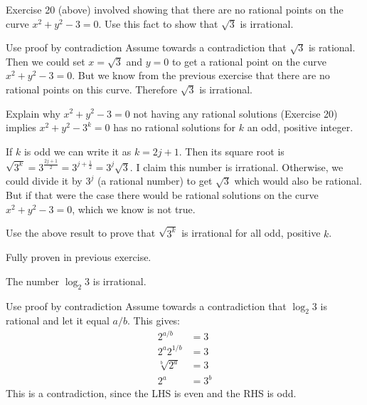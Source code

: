 \documentclass{article}
\begin{document}
\begin{problem}
    Exercise 20 (above) involved showing that there are no rational points on the curve $x^2 + y^2 - 3 = 0$. Use this fact to show that $\sqrt{3}$ is irrational.
\end{problem}
\begin{solution}{Use proof by contradiction}
    Assume towards a contradiction that $\sqrt{3}$ is rational. Then we could set $x = \sqrt{3}$ and $y = 0$ to get a rational point on the curve $x^2 + y^2 - 3 = 0$. But we know from the previous exercise that there are no rational points on this curve. Therefore $\sqrt{3}$ is irrational.
\end{solution}

\begin{problem}
    Explain why $x^2 + y^2 - 3 = 0$ not having any rational solutions (Exercise 20) implies $x^2 + y^2 - 3^k = 0$ has no rational solutions for $k$ an odd, positive integer.
\end{problem}
\begin{solution}{}
    If $k$ is odd we can write it as $k = 2j + 1$. Then its square root is $\sqrt{3^k} = 3^{\frac{2j +1}{2}} = 3^{j + \frac{1}{2}} = 3^j \sqrt{3}$.
    I claim this number is irrational. Otherwise, we could divide it by $3^j$ (a rational number) to get $\sqrt{3}$ which would also be rational. But if that were the case there would be rational solutions on the curve $x^2 + y^2 - 3 = 0$, which we know is not true.
\end{solution}
\begin{problem}
    Use the above result to prove that $\sqrt{3^k}$ is irrational for all odd, positive $k$.
\end{problem}
\begin{solution}{}
    Fully proven in previous exercise.
\end{solution}

\begin{problem}
    The number $\log_2 3$ is irrational.
\end{problem}
\begin{solution}{Use proof by contradiction}
    Assume towards a contradiction that $\log_2 3$ is rational and let it equal $a/b$. This gives:
    \begin{align*}
        2^{a/b} &= 3 \\
        2^a 2^{1/b} &= 3 \\
        \sqrt[b]{2^a} &= 3\\
        2^a &= 3^b
    \end{align*}
This is a contradiction, since the LHS is even and the RHS is odd.
\end{solution}
\end{document}
